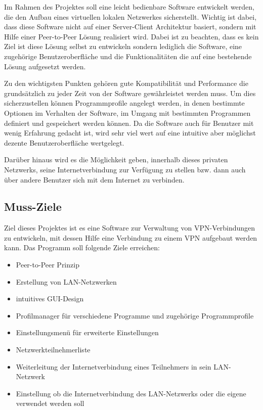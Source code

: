 \documentclass[a4paper,12pt]{scrreprt}
\begin{document}
		Im Rahmen des Projektes soll eine leicht bedienbare Software entwickelt werden, die den Aufbau eines virtuellen lokalen Netzwerkes sicherstellt. Wichtig ist dabei, dass diese Software nicht auf einer Server-Client Architektur basiert, sondern mit Hilfe einer Peer-to-Peer Lösung realisiert wird. Dabei ist zu beachten, dass es kein Ziel ist diese Lösung selbst zu entwickeln sondern lediglich die Software, eine zugehörige Benutzeroberfläche und die Funktionalitäten die auf eine bestehende Lösung aufgesetzt werden.
		
		Zu den wichtigsten Punkten gehören gute Kompatibilität und Performance die grundsätzlich zu jeder Zeit von der Software gewährleistet werden muss. Um dies sicherzustellen können Programmprofile angelegt werden, in denen bestimmte Optionen im Verhalten der Software, im Umgang mit bestimmten Programmen definiert und gespeichert werden können. Da die Software auch für Benutzer mit wenig Erfahrung gedacht ist, wird sehr viel wert auf eine intuitive aber möglichst dezente Benutzeroberfläche wertgelegt.
		
		Darüber hinaus wird es die Möglichkeit geben, innerhalb dieses privaten Netzwerks, seine Internetverbindung zur Verfügung zu stellen bzw. dann auch über andere Benutzer sich mit dem Internet zu verbinden.
		
			
		\subsection{Muss-Ziele}
		Ziel dieses Projektes ist es eine Software zur Verwaltung von VPN-Verbindungen zu entwickeln, mit dessen Hilfe eine Verbindung zu einem VPN aufgebaut werden kann. Das Programm soll folgende Ziele erreichen:\\
		\begin{itemize}
		\item Peer-to-Peer Prinzip
		\item Erstellung von LAN-Netzwerken
		\item intuitives GUI-Design
		\item Profilmanager für verschiedene Programme und zugehörige Programmprofile
		\item Einstellungsmenü für erweiterte Einstellungen
		\item Netzwerkteilnehmerliste
		\item Weiterleitung der Internetverbindung eines Teilnehmers in sein LAN-Netzwerk
		\item Einstellung ob die Internetverbindung des LAN-Netzwerks oder die eigene verwendet werden soll
		
		\end{itemize}
		
\end{document}
